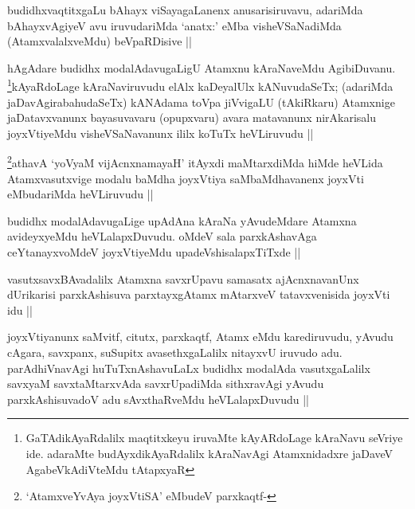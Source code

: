 \begin{artha}
budidhxvaqtitxgaLu bAhayx viSayagaLanenx anusarisiruvavu, adariMda bAhayxvAgiyeV avu iruvudariMda `anatx:' eMba visheVSaNadiMda (AtamxvalalxveMdu) beVpaRDisive ||
\end{artha}

\begin{artha}
hAgAdare budidhx modalAdavugaLigU Atamxnu kAraNaveMdu AgibiDuvanu. \footnote{GaTAdikAyaRdalilx maqtitxkeyu iruvaMte kAyARdoLage kAraNavu seVriye ide. adaraMte budAyxdikAyaRdalilx kAraNavAgi Atamxnidadxre jaDaveV AgabeVkAdiVteMdu tAtapxyaR}kAyaRdoLage kAraNaviruvudu elAlx kaDeyalUlx kANuvudaSeTx; (adariMda jaDavAgirabahudaSeTx) kANAdama toVpa jiVvigaLU (tAkiRkaru) Atamxnige jaDatavxvanunx bayasuvavaru (opupxvaru) avara matavanunx nirAkarisalu joyxVtiyeMdu visheVSaNavanunx ililx koTuTx heVLiruvudu ||
\end{artha}

\begin{artha}
\footnote{`AtamxveYvAya joyxVtiSA' eMbudeV parxkaqtf-}athavA `yoV\s yaM vijAcnxnamayaH' itAyxdi maMtarxdiMda hiMde heVLida Atamxvasutxvige modalu baMdha joyxVtiya saMbaMdhavanenx joyxVti eMbudariMda heVLiruvudu ||
\end{artha}

\begin{artha}
budidhx modalAdavugaLige upAdAna kAraNa yAvudeMdare Atamxna avideyxyeMdu heVLalapxDuvudu. oMdeV sala parxkAshavAga ceYtanayxvoMdeV joyxVtiyeMdu upadeVshisalapxTiTxde ||
\end{artha}

\begin{artha}
vasutxsavxBAvadalilx Atamxna savxrUpavu samasatx ajAcnxnavanUnx dUrikarisi parxkAshisuva parxtayxgAtamx mAtarxveV tatavxvenisida joyxVti idu ||
\end{artha}

\begin{artha}
joyxVtiyanunx saMvitf, citutx, parxkaqtf, Atamx eMdu karediruvudu, yAvudu cAgara, savxpanx, suSupitx avasethxgaLalilx nitayxvU iruvudo adu. parAdhiVnavAgi huTuTxnAshavuLaLx budidhx modalAda vasutxgaLalilx savxyaM savxtaMtarxvAda savxrUpadiMda sithxravAgi yAvudu parxkAshisuvadoV adu sAvxthaRveMdu heVLalapxDuvudu ||
\end{artha}

